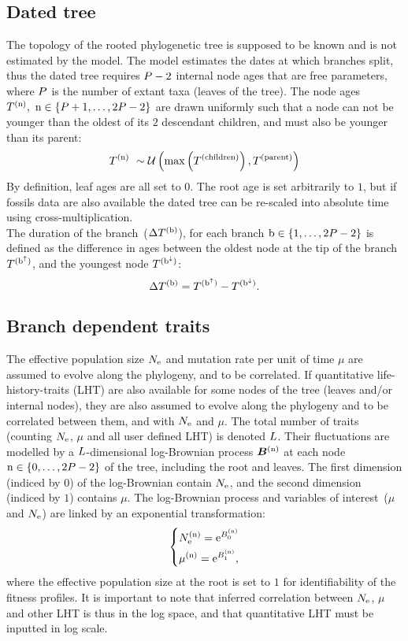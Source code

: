 \subsection{Dated tree}
The topology of the rooted phylogenetic tree is supposed to be known and is not estimated by the model. The model estimates the dates at which branches split, thus the dated tree requires $P - 2$ internal node ages that are free parameters, where $P$ is the number of extant taxa (leaves of the tree). 
The node ages $T^{(\text{n})},\ \text{n} \in \{P + 1, \hdots, 2 P - 2\}$ are drawn uniformly such that a node can not be younger than the oldest of its $2$ descendant children, and must also be younger than its parent:
\begin{equation}
\label{eq:Distribage}
\age\nodeexp \ \sim \mathcal{U}\left( \mathrm{max}\left(\age^{(\mathrm{children})} \right), \age^{(\mathrm{parent})} \right)
\end{equation}
By definition, leaf ages are all set to $0$. The root age is set arbitrarily to $1$, but if fossils data are also available the dated tree can be re-scaled into absolute time using cross-multiplication.\\
The duration of the branch~($\Delta T^{(\text{b})}$), for each branch $\text{b} \in \{1, \hdots, 2 P - 2\}$ is defined as the difference in ages between the oldest node at the tip of the branch $T^{(\text{b}^{\uparrow})}$, and the youngest node $T^{(\text{b}^{\downarrow})}$:
\begin{equation}
\label{eq:ageTobranchtime}
\branchtime\branchexp = \age^{(\nodeUp)} - \age^{(\nodeDown)}.
\end{equation}
\subsection{Branch dependent traits}
The effective population size $N_{\mathrm{e}}$ and mutation rate per unit of time $\mu$ are assumed to evolve along the phylogeny, and to be correlated.
If quantitative life-history-traits (LHT) are also available for some nodes of the tree (leaves and/or internal nodes), they are also assumed to evolve along the phylogeny and to be correlated between them, and with $N_{\mathrm{e}}$ and $\mu$.
The total number of traits (counting $N_{\mathrm{e}}$, $\mu$ and all user defined LHT) is denoted $L$.
Their fluctuations are modelled by a $L$-dimensional log-Brownian process $\bm{B}^{(\text{n})}$ at each node $\text{n} \in \{0, \hdots, 2 P - 2\}$ of the tree, including the root and leaves.
The first dimension (indiced by $0$) of the log-Brownian contain $N_{\mathrm{e}}$, and the second dimension (indiced by $1$) contains $\mu$.
The log-Brownian process and variables of interest~($\mu$ and $N_{\mathrm{e}}$) are linked by an exponential transformation:
\begin{equation}
\begin{dcases}
N_{\mathrm{e}}^{(\text{n})} = \mathrm{e}^{ B_{0}^{(\text{n})} } \\ 
\mu^{(\text{n})} = \mathrm{e}^{ B_{1}^{(\text{n})} },
\end{dcases}
\end{equation}
where the effective population size at the root is set to $1$ for identifiability of the fitness profiles.
It is important to note that inferred correlation between $N_{\mathrm{e}}$, $\mu$ and other LHT is thus in the log space, and that quantitative LHT must be inputted in log scale.

